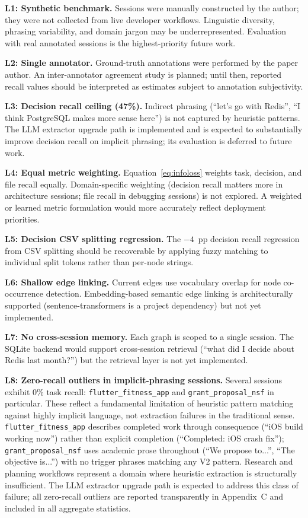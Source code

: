\documentclass[journal]{IEEEtran}
\begin{document}
\textbf{L1: Synthetic benchmark.}
Sessions were manually constructed by the author; they were
not collected from live developer workflows.
Linguistic diversity, phrasing variability, and domain
jargon may be underrepresented.
Evaluation with real annotated sessions is the
highest-priority future work.

\textbf{L2: Single annotator.}
Ground-truth annotations were performed by the paper author.
An inter-annotator agreement study is planned; until then,
reported recall values should be interpreted as estimates
subject to annotation subjectivity.

\textbf{L3: Decision recall ceiling (47\%).}
Indirect phrasing (``let's go with Redis'',
``I think PostgreSQL makes more sense here'') is not captured
by heuristic patterns.
The LLM extractor upgrade path is implemented and is
expected to substantially improve decision recall on implicit
phrasing; its evaluation is deferred to future work.

\textbf{L4: Equal metric weighting.}
Equation~\eqref{eq:infoloss} weights task, decision, and
file recall equally.
Domain-specific weighting (decision recall matters more
in architecture sessions; file recall in debugging sessions)
is not explored. A weighted or learned metric formulation
would more accurately reflect deployment priorities.

\textbf{L5: Decision CSV splitting regression.}
The $-4$~pp decision recall regression from CSV splitting
should be recoverable by applying fuzzy matching to individual
split tokens rather than per-node strings.

\textbf{L6: Shallow edge linking.}
Current edges use vocabulary overlap for node co-occurrence
detection.
Embedding-based semantic edge linking is architecturally
supported (sentence-transformers is a project dependency)
but not yet implemented.

\textbf{L7: No cross-session memory.}
Each graph is scoped to a single session.
The SQLite backend would support cross-session retrieval
(``what did I decide about Redis last month?'') but the
retrieval layer is not yet implemented.

\textbf{L8: Zero-recall outliers in implicit-phrasing sessions.}
Several sessions exhibit 0\% task recall:
\texttt{flutter\_fitness\_app} and \texttt{grant\_proposal\_nsf}
in particular.
These reflect a fundamental limitation of heuristic pattern
matching against highly implicit language, not extraction
failures in the traditional sense.
\texttt{flutter\_fitness\_app} describes completed work through
consequence (``iOS build working now'') rather than explicit
completion (``Completed: iOS crash fix'');
\texttt{grant\_proposal\_nsf} uses academic prose throughout
(``We propose to...'', ``The objective is...'') with no
trigger phrases matching any V2 pattern.
Research and planning workflows represent a domain where
heuristic extraction is structurally insufficient.
The LLM extractor upgrade path is expected to address this
class of failure; all zero-recall outliers are reported
transparently in Appendix~C and included in all aggregate
statistics.
\end{document}
